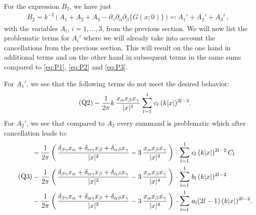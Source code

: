 For the expression $B_2$, we have just 
\begin{align*}
  B_2 = k^{-2} \, \Big( \, A_1 + A_2 + A_3 - \partial_\gamma\partial_\alpha\partial_\beta \Big\{ G(x; 0)\Big\} \, \Big) \eqqcolon A_1' + A_2' + A_3'\,,
\end{align*}
with the variables $A_i$, $i = 1, \dots, 3$, from the previous section. 
We will now list the problematic terms for $A_i'$ where we will already take into account the cancellations from the previous section.
This will result on the one hand in additional terms and on the other hand in subsequent terms in the same sums compared to \eqref{eq:P1}, \eqref{eq:P2} and \eqref{eq:P3}.

For $A_1'$, we see that the following terms do not meet the desired behavior:
\begin{align}
  \label{eq:Q2}
  \tag{Q2}
  \begin{alignedat}{1}
  &- \frac{1}{2 \pi } k \, \frac{x_\alpha x_\beta x_\gamma}{|x|^3} \; \mathlarger{\sum}_{l = 1}^1 \; c_l \, (k|x|)^{2l - 3}. 
  \end{alignedat}
\end{align}
For $A_2'$, we see that compared to $A_2$ every summand is problematic which after cancellation leads to:
\begin{align}
  \label{eq:Q3}
  \tag{Q3}
  \begin{alignedat}{1}
  &- \frac{1}{2\pi} \, \bigg(\,\frac{\delta_{\beta\gamma} x_\alpha + \delta_{\alpha \gamma} x_\beta + \delta_{\alpha \beta} x_\gamma}{|x|^2} - 3\, \frac{x_\alpha x_\beta x_\gamma}{|x|^4} \, \bigg) 
  \,\cdot \mathlarger{\sum}_{l = 1}^1 \; c_l \, (k|x|)^{2l - 2} \, C_l \\
  &- \frac{1}{2\pi} \, \bigg(\, \frac{\delta_{\beta\gamma} x_\alpha + \delta_{\alpha \gamma} x_\beta + \delta_{\alpha \beta} x_\gamma}{|x|^2} - 3\, \frac{x_\alpha x_\beta x_\gamma}{|x|^4} \, \bigg) 
  \,\cdot \mathlarger{\sum}_{l = 1}^1 \; b_l \, (k|x|)^{2l - 2}  \\
  &- \frac{1}{2\pi} \, \bigg(\,\frac{\delta_{\beta\gamma} x_\alpha + \delta_{\alpha \gamma} x_\beta + \delta_{\alpha \beta} x_\gamma}{|x|^2} - 3\, \frac{x_\alpha x_\beta x_\gamma}{|x|^4} \, \bigg) 
  \,\cdot \mathlarger{\sum}_{l = 1}^1 \; a_l (2l - 1) \, (k|x|)^{2l - 2} .
  \end{alignedat}
\end{align}

